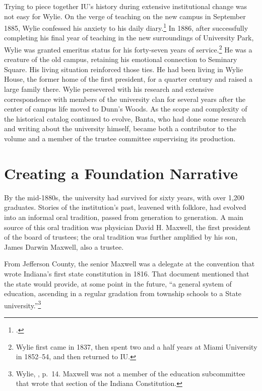 \documentclass[
  american,
  letterpaper,
]{scrreprt}
\begin{document}
Trying to piece together IU's history during extensive institutional
change was not easy for Wylie. On the verge of teaching on the new
campus in September 1885, Wylie confessed his anxiety to his daily
diary.\footnote{.} In 1886, after successfully completing his final year of
teaching in the new surroundings of University Park, Wylie was granted
emeritus status for his forty-seven years of service.\footnote{Wylie
  first came in 1837, then spent two and a half years at Miami
  University in 1852--54, and then returned to IU.} He was a creature of
the old campus, retaining his emotional connection to Seminary Square.
His living situation reinforced those ties. He had been living in Wylie
House, the former home of the first president, for a quarter century and
raised a large family there. Wylie persevered with his research and
extensive correspondence with members of the university clan for several
years after the center of campus life moved to Dunn's Woods. As the
scope and complexity of the historical catalog continued to evolve,
Banta, who had done some research and writing about the university
himself, became both a contributor to the volume and a member of the
trustee committee supervising its production.

\section{Creating a Foundation
Narrative}\label{creating-a-foundation-narrative}

By the mid-1880s, the university had survived for sixty years, with over
1,200 graduates. Stories of the institution's past, leavened with
folklore, had evolved into an informal oral tradition, passed from
generation to generation. A main source of this oral tradition was
physician David H. Maxwell, the first president of the board of
trustees; the oral tradition was further amplified by his son, James
Darwin Maxwell, also a trustee.

From Jefferson County, the senior Maxwell was a delegate at the
convention that wrote Indiana's first state constitution in 1816. That
document mentioned that the state would provide, at some point in the
future, ``a general system of education, ascending in a regular
gradation from township schools to a State university.''\footnote{Wylie,
  , p.~14. Maxwell was not a member of the education
  subcommittee that wrote that section of the Indiana Constitution.}
\end{document}
